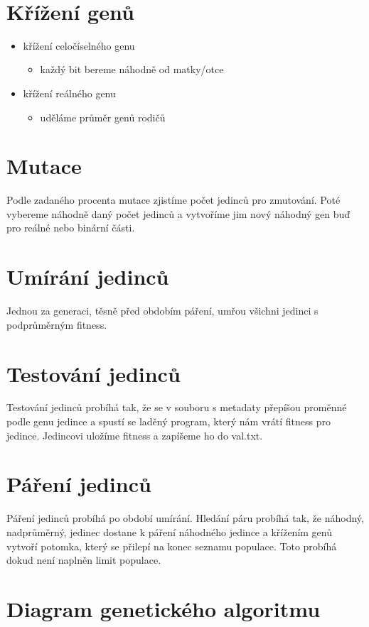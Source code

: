 \documentclass{article}
\begin{document}
 \ \ \ \ \ 
\section{Křížení genů}
\begin{itemize}
\item křížení celočíselného genu
\begin{itemize}
\item každý bit bereme náhodně od matky/otce
\end{itemize}
\item křížení reálného genu
\begin{itemize}
\item uděláme průměr genů rodičů
\end{itemize}
\end{itemize}
\section{Mutace}

Podle zadaného procenta mutace zjistíme počet jedinců pro zmutování. Poté vybereme náhodně daný počet jedinců a vytvoříme jim nový náhodný gen buď pro reálné nebo binární části.
\section{Umírání jedinců}

Jednou za generaci, těsně před obdobím páření, umřou všichni jedinci s podprůměrným fitness.
\section{Testování jedinců}

Testování jedinců probíhá tak, že se v souboru s metadaty přepíšou proměnné podle genu jedince a spustí se laděný program, který nám vrátí fitness pro jedince. Jedincovi uložíme fitness a zapíšeme ho do val.txt.
\section{Páření jedinců}

Páření jedinců probíhá po období umírání. Hledání páru probíhá tak, že náhodný, nadprůměrný, jedinec dostane k páření náhodného jedince a křížením genů vytvoří potomka, který se přilepí na konec seznamu populace. Toto probíhá dokud není naplněn limit populace.






\section{Diagram genetického algoritmu}
\end{document}
